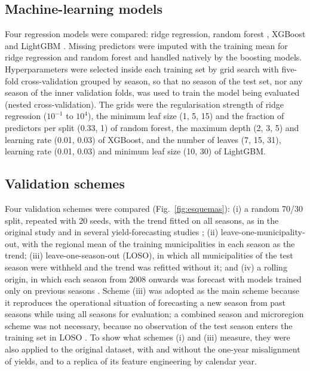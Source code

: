 \documentclass[pdflatex,sn-basic]{sn-jnl}
\begin{document}
\subsection{Machine-learning models}\label{sec:models}
Four regression models were compared: ridge regression, random forest \citep{breiman2001}, XGBoost \citep{chen2016} and LightGBM \citep{ke2017}. Missing predictors were imputed with the training mean for ridge regression and random forest and handled natively by the boosting models. Hyperparameters were selected inside each training set by grid search with five-fold cross-validation grouped by season, so that no season of the test set, nor any season of the inner validation folds, was used to train the model being evaluated (nested cross-validation). The grids were the regularisation strength of ridge regression ($10^{-1}$ to $10^{4}$), the minimum leaf size (1, 5, 15) and the fraction of predictors per split (0.33, 1) of random forest, the maximum depth (2, 3, 5) and learning rate (0.01, 0.03) of XGBoost, and the number of leaves (7, 15, 31), learning rate (0.01, 0.03) and minimum leaf size (10, 30) of LightGBM.

\subsection{Validation schemes}\label{sec:cv}
Four validation schemes were compared (Fig.~\ref{fig:esquemas}): (i) a random 70/30 split, repeated with 20 seeds, with the trend fitted on all seasons, as in the original study \citep{tluszcz2025} and in several yield-forecasting studies \citep{Torsoni2023,BarbosadosSantos2021}; (ii) leave-one-municipality-out, with the regional mean of the training municipalities in each season as the trend; (iii) leave-one-season-out (LOSO), in which all municipalities of the test season were withheld and the trend was refitted without it; and (iv) a rolling origin, in which each season from 2008 onwards was forecast with models trained only on previous seasons \citep{tashman2000}. Scheme (iii) was adopted as the main scheme because it reproduces the operational situation of forecasting a new season from past seasons while using all seasons for evaluation; a combined season and microregion scheme was not necessary, because no observation of the test season enters the training set in LOSO \citep{roberts2017}. To show what schemes (i) and (iii) measure, they were also applied to the original dataset, with and without the one-year misalignment of yields, and to a replica of its feature engineering by calendar year.
\end{document}
